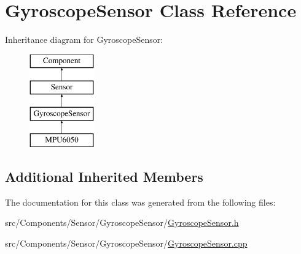 \hypertarget{classGyroscopeSensor}{}\section{Gyroscope\+Sensor Class Reference}
\label{classGyroscopeSensor}
Inheritance diagram for Gyroscope\+Sensor\+:\begin{figure}[H]
\begin{center}
\leavevmode
\includegraphics[height=4.000000cm]{classGyroscopeSensor}
\end{center}
\end{figure}
\subsection*{Additional Inherited Members}


The documentation for this class was generated from the following files\+:\begin{DoxyCompactItemize}
\item 
src/\+Components/\+Sensor/\+Gyroscope\+Sensor/\hyperlink{GyroscopeSensor_8h}{Gyroscope\+Sensor.\+h}\item 
src/\+Components/\+Sensor/\+Gyroscope\+Sensor/\hyperlink{GyroscopeSensor_8cpp}{Gyroscope\+Sensor.\+cpp}\end{DoxyCompactItemize}
